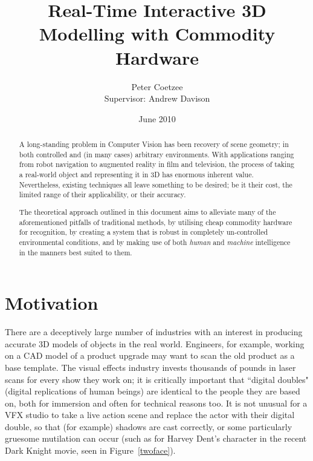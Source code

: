 \documentclass[a4paper,10pt]{article}
\title{Real-Time Interactive 3D Modelling with Commodity Hardware
\vspace{30pt}}
\author{Peter Coetzee\\Supervisor: Andrew Davison
\vspace{30pt}}
\date{June 2010}
\begin{document}
\maketitle

\vspace{50pt}

\begin{abstract}
A long-standing problem in Computer Vision has been recovery of scene geometry; in both controlled and (in many cases) arbitrary environments. With applications ranging from robot navigation to augmented reality in film and television, the process of taking a real-world object and representing it in 3D has enormous inherent value. Nevertheless, existing techniques all leave something to be desired; be it their cost, the limited range of their applicability, or their accuracy.

The theoretical approach outlined in this document aims to alleviate many of the aforementioned pitfalls of traditional methods, by utilising cheap commodity hardware for recognition, by creating a system that is robust in completely un-controlled environmental conditions, and by making use of both \textit{human} and \textit{machine} intelligence in the manners best suited to them.
\end{abstract}

\pagebreak
\tableofcontents
\pagebreak

\section{Motivation}
There are a deceptively large number of industries with an interest in producing accurate 3D models of objects in the real world. Engineers, for example, working on a CAD model of a product upgrade may want to scan the old product as a base template. The visual effects industry invests thousands of pounds in laser scans for every show they work on; it is critically important that ``digital doubles" (digital replications of human beings) are identical to the people they are based on, both for immersion and often for technical reasons too. It is not unusual for a VFX studio to take a live action scene and replace the actor with their digital double, so that (for example) shadows are cast correctly, or some particularly gruesome mutilation can occur (such as for Harvey Dent's character in the recent Dark Knight movie, seen in Figure~\ref{twoface}).
\end{document}
